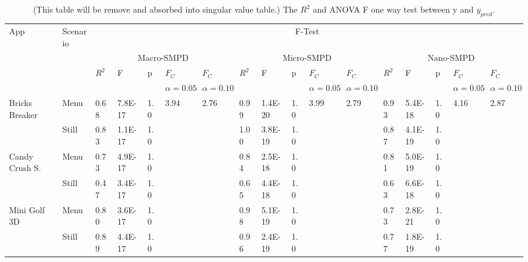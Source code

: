 \begin{table*}[tb]
\centering
{\footnotesize
    \centering
    \caption{(This table will be remove and absorbed into singular value table.) The $R^{2}$ and ANOVA F one way test between y and $y_{pred}$.
    }
    \begin{tabular}{|p{12mm}|p{9.5mm}|p{4mm}|p{9.5mm}|p{2.5mm}|p{4mm}|p{4mm}|p{4mm}|p{9.5mm}|p{2.5mm}|p{4mm}|p{4mm}|p{4mm}|p{9.5mm}|p{2.5mm}|p{4mm}|p{4mm}|}
    \hline
        App & Scenario & \multicolumn{15}{c|}{F-Test} \\
        \cline{3-17}
        & & \multicolumn{5}{c|}{Macro-SMPD} & \multicolumn{5}{c|}{Micro-SMPD} & \multicolumn{5}{c|}{Nano-SMPD} \\
        \cline{3-17}
        & & $R^{2}$ & F & p & $F_{C}$ & $F_{C}$ & $R^{2}$ & F & p & $F_{C}$ & $F_{C}$ & $R^{2}$ & F & p & $F_{C}$ & $F_{C}$ \\
        & & & & & \scriptsize{$\alpha=0.05$} & \scriptsize{$\alpha=0.10$} & & & & \scriptsize{$\alpha=0.05$} & \scriptsize{$\alpha=0.10$} & & & & \scriptsize{$\alpha=0.05$} & \scriptsize{$\alpha=0.10$} \\
        \hline
        \multirow{2}{13mm}{Bricks Breaker} & Menu & 0.68 & 7.8E-17 &  1.0 & \multirow{6}{2mm}{3.94} & \multirow{6}{2mm}{2.76}        & 0.99 & 1.4E-20 &  1.0 & \multirow{6}{2mm}{3.99} & \multirow{6}{2mm}{2.79}        & 0.93 & 5.4E-18 &  1.0 & \multirow{6}{2mm}{4.16} & \multirow{6}{2mm}{2.87}       \\
        \cline{2-5}
        \cline{8-10}
        \cline{13-15}
         & Still & 0.83 & 1.1E-17 &  1.0 &      &             & 1.00 & 3.8E-19 &  1.0 &      &             & 0.87 & 4.1E-19 &  1.0 &      &            \\
        \cline{1-5}
        \cline{8-10}
        \cline{13-15}
        \multirow{2}{13mm}{Candy Crush S.} & Menu & 0.73 & 4.9E-17 &  1.0 &      &             & 0.84 & 2.5E-18 &  1.0 &      &             & 0.81 & 5.0E-19 &  1.0 &      &            \\
        \cline{2-5}
        \cline{8-10}
        \cline{13-15}
	     & Still & 0.47 & 3.4E-17 &  1.0 &      &             & 0.65 & 4.4E-18 &  1.0 &      &             & 0.63 & 6.6E-18 &  1.0 &      &            \\
	    \cline{1-5}
        \cline{8-10}
        \cline{13-15}
        \multirow{2}{13mm}{Mini Golf 3D} & Menu & 0.80 & 3.6E-17 &  1.0 &      &             & 0.98 & 5.1E-19 &  1.0 &      &             & 0.73 & 2.8E-21 &  1.0 &      &            \\
        \cline{2-5}
        \cline{8-10}
        \cline{13-15}
         & Still & 0.89 & 4.4E-17 &  1.0 &      &             & 0.96 & 2.4E-19 &  1.0 &      &             & 0.77 & 1.8E-19 &  1.0 &      &            \\
        \hline
    \end{tabular}
    \label{tab:test_table}
    \vspace{-0.1in}
}
\end{table*}